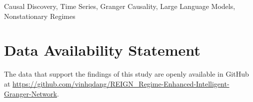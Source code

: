 \documentclass{BVP_JDSIS}
\begin{document}
\begin{keywords}
Causal Discovery, Time Series, Granger Causality, Large Language Models, Nonstationary Regimes
\end{keywords}

\maketitle







\section*{Data Availability Statement}
The data that support the findings of this study are openly available in GitHub at \url{https://github.com/vinhqdang/REIGN_Regime-Enhanced-Intelligent-Granger-Network}.



\end{document}
